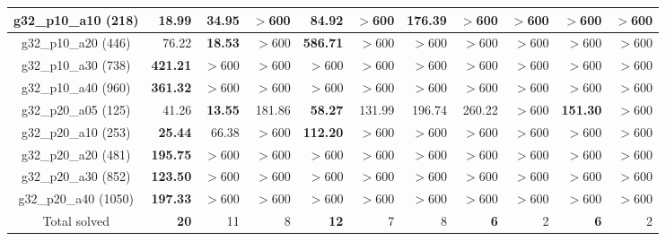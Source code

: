 \documentclass[conference]{IEEEtran}
\begin{document}
\begin{table}[t]
\begin{tabular}{|c||r|r||r|r|r|r||r|r|r|r|}
g32\_p10\_a10 (218) & {\bf 18.99} & 34.95 & $>$600 & {\bf 84.92} & $>$600 & 176.39 & $>$600 & $>$600 & $>$600 & $>$600 \\ \hline
g32\_p10\_a20 (446) & 76.22 & {\bf 18.53} & $>$600 & {\bf 586.71} & $>$600 & $>$600 & $>$600 & $>$600 & $>$600 & $>$600 \\ \hline
g32\_p10\_a30 (738) & {\bf 421.21} & $>$600 & $>$600 & $>$600 & $>$600 & $>$600 & $>$600 & $>$600 & $>$600 & $>$600 \\ \hline
g32\_p10\_a40 (960) & {\bf 361.32} & $>$600 & $>$600 & $>$600 & $>$600 & $>$600 & $>$600 & $>$600 & $>$600 & $>$600\\ \hline
g32\_p20\_a05 (125) & 41.26 & {\bf 13.55} & 181.86 & {\bf 58.27} & 131.99 & 196.74 & 260.22 & $>$600 & {\bf 151.30} & $>$600 \\ \hline
g32\_p20\_a10 (253) & {\bf 25.44} & 66.38 & $>$600 & {\bf 112.20} & $>$600 & $>$600 & $>$600 & $>$600 & $>$600 & $>$600\\ \hline
g32\_p20\_a20 (481) & {\bf 195.75} & $>$600 & $>$600 & $>$600 & $>$600 & $>$600 & $>$600 & $>$600 & $>$600 & $>$600 \\ \hline
g32\_p20\_a30 (852) & {\bf 123.50} & $>$600 & $>$600 & $>$600 & $>$600 & $>$600 & $>$600 & $>$600 & $>$600 & $>$600 \\ \hline
g32\_p20\_a40 (1050) & {\bf 197.33} & $>$600 & $>$600 & $>$600 & $>$600 & $>$600 & $>$600 & $>$600 & $>$600 & $>$600 \\ \hline \hline
Total solved & {\bf 20} & 11 & 8 & {\bf 12} & 7 & 8 & {\bf 6} & 2 & {\bf 6} & 2 \\ \hline
\end{tabular}
\end{table}
\end{document}
